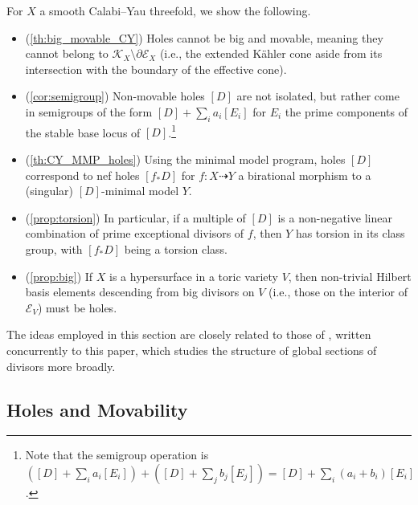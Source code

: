 \documentclass[11pt,dvipsnames]{article}
\theoremstyle{definition}
\begin{document}
For $X$ a smooth Calabi--Yau threefold, we show the following.
\begin{itemize}
    \item (\cref{th:big_movable_CY}) Holes cannot be big and movable, meaning they cannot belong to $\mathcal{K}_X \setminus \partial \mathcal{E}_X$ (i.e., the extended K\"ahler cone aside from its intersection with the boundary of the effective cone).
    \item (\cref{cor:semigroup}) Non-movable holes $[D]$ are not isolated, but rather come in semigroups of the form $[D] + \sum_i a_i [E_i]$ for $E_i$ the prime components of the stable base locus of $[D]$.\footnote{Note that the semigroup operation is $([D] + \sum_i a_i [E_i]) + ([D] + \sum_j b_j [E_j]) = [D] + \sum_i (a_i + b_i) [E_i]$.} 
    \item (\cref{th:CY_MMP_holes}) Using the minimal model program, holes $[D]$ correspond to nef holes $[f_* D]$ for $f : X \dashrightarrow Y$ a birational morphism to a (singular) $[D]$-minimal model $Y$.
    \item (\cref{prop:torsion}) In particular, if a multiple of $[D]$ is a non-negative linear combination of prime exceptional divisors of $f$, then $Y$ has torsion in its class group, with $[f_* D]$ being a torsion class.
    \item (\cref{prop:big}) If $X$ is a hypersurface in a toric variety $V$, then non-trivial Hilbert basis elements descending from big divisors on $V$ (i.e., those on the interior of $\mathcal{E}_V$) must be holes.
\end{itemize}
The ideas employed in this section are closely related to those of \cite{constantin_inprep}, written concurrently to this paper, which studies the structure of global sections of divisors more broadly.

\subsection{Holes and Movability}
\end{document}
